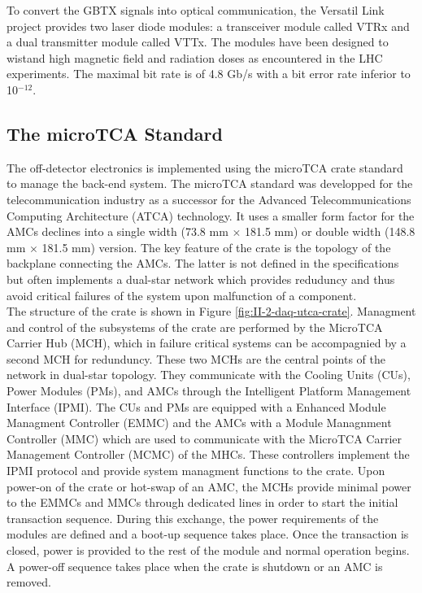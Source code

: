       To convert the GBTX signals into optical communication, the Versatil Link project provides two laser diode modules: a transceiver module called VTRx and a dual transmitter module called VTTx. The modules have been designed to wistand high magnetic field and radiation doses as encountered in the LHC experiments. The maximal bit rate is of 4.8 Gb/s with a bit error rate inferior to 10$^{-12}$.

    \subsection{The microTCA Standard}

      The off-detector electronics is implemented using the microTCA crate standard to manage the back-end system. The microTCA standard was developped for the telecommunication industry as a successor for the Advanced Telecommunications Computing Architecture (ATCA) technology. It uses a smaller form factor for the AMCs declines into a single width (73.8 mm $ \times $ 181.5 mm) or double width (148.8 mm $ \times $ 181.5 mm) version. The key feature of the crate is the topology of the backplane connecting the AMCs. The latter is not defined in the specifications but often implements a dual-star network which provides reduduncy and thus avoid critical failures of the system upon malfunction of a component. \\

      The structure of the crate is shown in Figure \ref{fig:II-2-daq-utca-crate}. Managment and control of the subsystems of the crate are performed by the MicroTCA Carrier Hub (MCH), which in failure critical systems can be accompagnied by a second MCH for redunduncy. These two MCHs are the central points of the network in dual-star topology. They communicate with the Cooling Units (CUs), Power Modules (PMs), and AMCs through the Intelligent Platform Management Interface (IPMI). The CUs and PMs are equipped with a Enhanced Module Managment Controller (EMMC) and the AMCs with a Module Managnment Controller (MMC) which are used to communicate with the MicroTCA Carrier Management Controller (MCMC) of the MHCs. These controllers implement the IPMI protocol and provide system managment functions to the crate. Upon power-on of the crate or hot-swap of an AMC, the MCHs provide minimal power to the EMMCs and MMCs through dedicated lines in order to start the initial transaction sequence. During this exchange, the power requirements of the modules are defined and a boot-up sequence takes place. Once the transaction is closed, power is provided to the rest of the module and normal operation begins. A power-off sequence takes place when the crate is shutdown or an AMC is removed. \\

